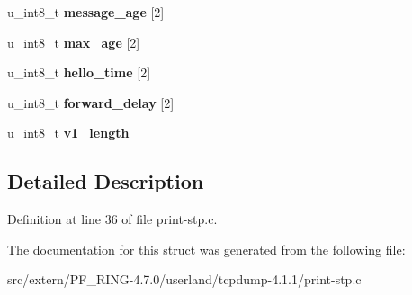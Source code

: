 \begin{DoxyCompactItemize}
\item 
\hypertarget{structstp__bpdu___a7ef4962666a1cf924d91e5851fbc62f1}{
u\_\-int8\_\-t {\bfseries message\_\-age} \mbox{[}2\mbox{]}}
\label{structstp__bpdu___a7ef4962666a1cf924d91e5851fbc62f1}

\item 
\hypertarget{structstp__bpdu___adbbf88a5e78dfc34d657e93c9da1d82f}{
u\_\-int8\_\-t {\bfseries max\_\-age} \mbox{[}2\mbox{]}}
\label{structstp__bpdu___adbbf88a5e78dfc34d657e93c9da1d82f}

\item 
\hypertarget{structstp__bpdu___afc142fb6024a549fcbdf7a21a5cbfdec}{
u\_\-int8\_\-t {\bfseries hello\_\-time} \mbox{[}2\mbox{]}}
\label{structstp__bpdu___afc142fb6024a549fcbdf7a21a5cbfdec}

\item 
\hypertarget{structstp__bpdu___a18ad59063ef2b2c1c685681740ea14c5}{
u\_\-int8\_\-t {\bfseries forward\_\-delay} \mbox{[}2\mbox{]}}
\label{structstp__bpdu___a18ad59063ef2b2c1c685681740ea14c5}

\item 
\hypertarget{structstp__bpdu___ad780b2f6550ee8257de0ba8f77192ca4}{
u\_\-int8\_\-t {\bfseries v1\_\-length}}
\label{structstp__bpdu___ad780b2f6550ee8257de0ba8f77192ca4}

\end{DoxyCompactItemize}


\subsection{Detailed Description}


Definition at line 36 of file print-\/stp.c.



The documentation for this struct was generated from the following file:\begin{DoxyCompactItemize}
\item 
src/extern/PF\_\-RING-\/4.7.0/userland/tcpdump-\/4.1.1/print-\/stp.c\end{DoxyCompactItemize}

